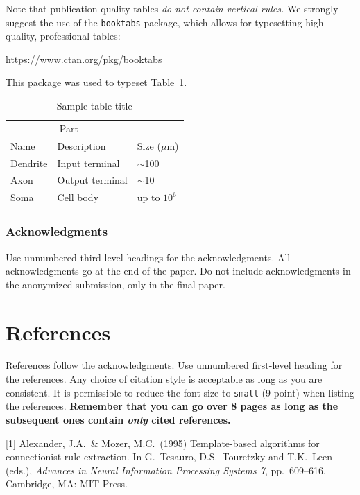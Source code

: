 \documentclass{article}
\begin{document}
Note that publication-quality tables \emph{do not contain vertical
  rules.} We strongly suggest the use of the \verb+booktabs+ package,
which allows for typesetting high-quality, professional tables:
\begin{center}
  \url{https://www.ctan.org/pkg/booktabs}
\end{center}
This package was used to typeset Table~\ref{sample-table}.

\begin{table}[t]
  \caption{Sample table title}
  \label{sample-table}
  \centering
  \begin{tabular}{lll}
    \toprule
    \multicolumn{2}{c}{Part}                   \\
    \cmidrule{1-2}
    Name     & Description     & Size ($\mu$m) \\
    \midrule
    Dendrite & Input terminal  & $\sim$100     \\
    Axon     & Output terminal & $\sim$10      \\
    Soma     & Cell body       & up to $10^6$  \\
    \bottomrule
  \end{tabular}
\end{table}


\subsubsection*{Acknowledgments}

Use unnumbered third level headings for the acknowledgments. All
acknowledgments go at the end of the paper. Do not include
acknowledgments in the anonymized submission, only in the final paper.

\section*{References}

References follow the acknowledgments. Use unnumbered first-level
heading for the references. Any choice of citation style is acceptable
as long as you are consistent. It is permissible to reduce the font
size to \verb+small+ (9 point) when listing the references. {\bf
  Remember that you can go over 8 pages as long as the subsequent ones contain
  \emph{only} cited references.}
\medskip

\small

[1] Alexander, J.A.\ \& Mozer, M.C.\ (1995) Template-based algorithms
for connectionist rule extraction. In G.\ Tesauro, D.S.\ Touretzky and
T.K.\ Leen (eds.), {\it Advances in Neural Information Processing
  Systems 7}, pp.\ 609--616. Cambridge, MA: MIT Press.
\end{document}
